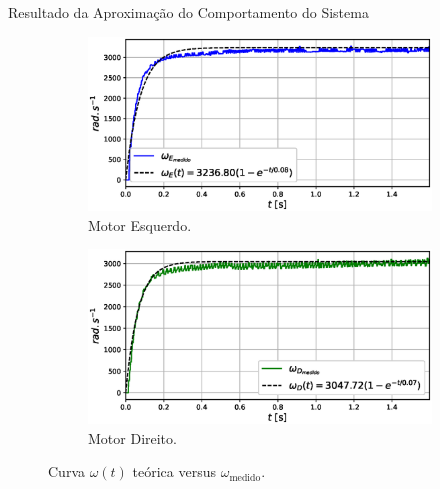 \begin{frame}{Resultado da Aproximação do Comportamento do Sistema}


\begin{figure}
    \begin{subfigure}{.48\textwidth}
        \centering
        \includegraphics[width=1.15\textwidth]{figuras/resultados/exp01/regressao_vs_medido_esquerdo100.eps}
        \caption{Motor Esquerdo.}
    \end{subfigure}
    \begin{subfigure}{.48\textwidth}
        \centering
        \includegraphics[width=1.15\textwidth]{figuras/resultados/exp01/regressao_vs_medido_direito100.eps}
        \caption{Motor Direito.}
    \end{subfigure}
    \caption{Curva $\omega(t)$ teórica versus $\omega_{\text{medido}}$.}
\end{figure}
    
\end{frame}


